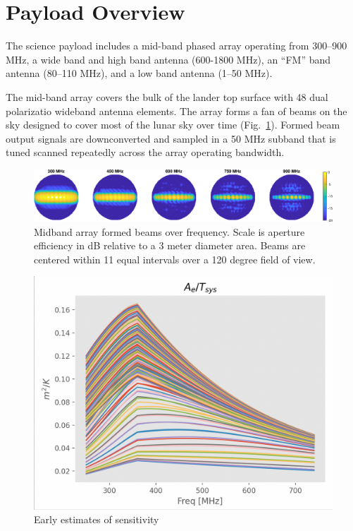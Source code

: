 \documentclass[preprint]{aastex631}
\begin{document}
\section{Payload Overview}
\label{sec:payload}
%

The science payload includes a mid-band phased array operating from 300--900 MHz, a wide band and high band antenna (600-1800 MHz), an ``FM'' band antenna (80--110 MHz), and a low band antenna (1--50 MHz). 

The mid-band array covers the bulk of the lander top surface with 48 dual polarizatio wideband antenna elements. The array forms a fan of beams on the sky designed to cover most of the lunar sky over time (Fig.\ \ref{fig:midband_beam_maps}). Formed beam output signals are downconverted and sampled in a  50 MHz subband that is tuned scanned repeatedly across the array operating bandwidth. 

\begin{figure}
	\centering
	\includegraphics[width=\linewidth]{figures/midband_array_28cm_3dBSLL_beams_max.eps}
	\caption{Midband array formed beams over frequency. Scale is aperture efficiency in dB relative to a 3 meter diameter area. Beams are centered within 11 equal intervals over a 120 degree field of view.}
	\label{fig:midband_beam_maps}
\end{figure}

\begin{figure}
	\centering
	\includegraphics[width=\linewidth]{figures/sensitivity_early_est.png}
	\caption{Early estimates of sensitivity}
\end{figure}
\end{document}
